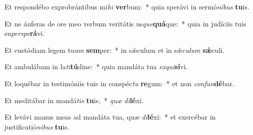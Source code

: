 \item Et respondébo exprobrántibus mi\textit{hi} \textbf{ver}bum:~* quia sperávi in sermó\textit{ni}\textit{bus} \textbf{tu}is.
\item Et ne áuferas de ore meo verbum veritátis us\textit{que}\textbf{quá}que:~* quia in judíciis tuis su\textit{per}\textit{spe}\textbf{rá}vi.
\item Et custódiam legem tu\textit{am} \textbf{sem}per:~* in sǽculum et in sǽ\textit{cu}\textit{lum} \textbf{sǽ}culi.
\item Et ambulábam in la\textit{ti}\textbf{tú}dine:~* quia mandáta tua \textit{ex}\textit{qui}\textbf{sí}vi.
\item Et loquébar in testimóniis tuis in conspéc\textit{tu} \textbf{re}gum:~* et non \textit{con}\textit{fun}\textbf{dé}bar.
\item Et meditábar in mandá\textit{tis} \textbf{tu}is,~* \textit{quæ} \textit{di}\textbf{lé}xi.
\item Et levávi manus meas ad mandáta tua, quæ \textit{di}\textbf{lé}xi:~* et exercébar in justificatió\textit{ni}\textit{bus} \textbf{tu}is.
